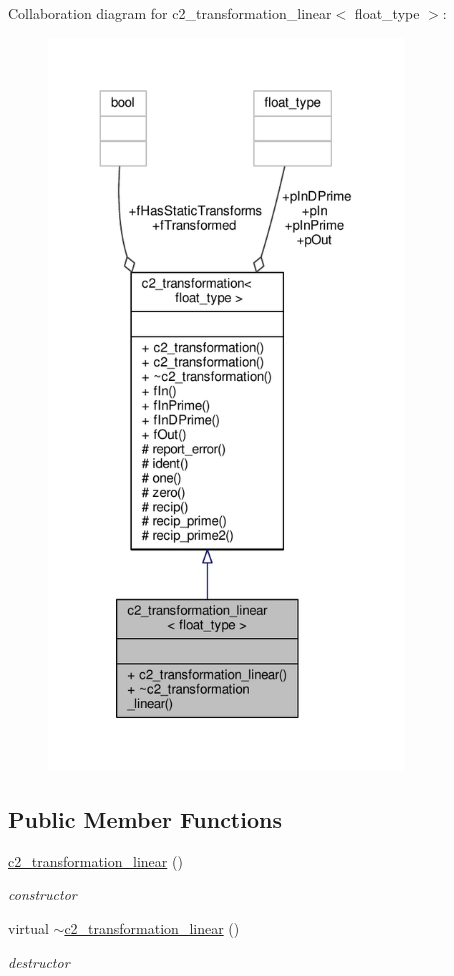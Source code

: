 Collaboration diagram for c2\+\_\+transformation\+\_\+linear$<$ float\+\_\+type $>$\+:
\nopagebreak
\begin{figure}[H]
\begin{center}
\leavevmode
\includegraphics[height=550pt]{classc2__transformation__linear__coll__graph}
\end{center}
\end{figure}
\subsection*{Public Member Functions}
\begin{DoxyCompactItemize}
\item 
\hyperlink{classc2__transformation__linear_ac3ea2dc8112026ab912c1d40546b5493}{c2\+\_\+transformation\+\_\+linear} ()
\begin{DoxyCompactList}\small\item\em constructor \end{DoxyCompactList}\item 
virtual \hyperlink{classc2__transformation__linear_ad53dc59cddc116f38047c8c8f1d35760}{$\sim$c2\+\_\+transformation\+\_\+linear} ()
\begin{DoxyCompactList}\small\item\em destructor \end{DoxyCompactList}\end{DoxyCompactItemize}
